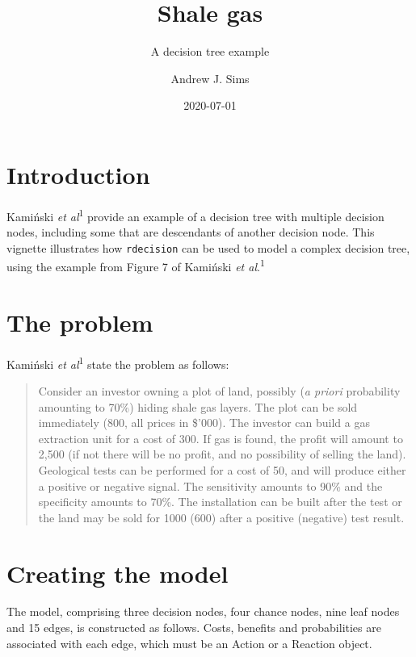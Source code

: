 \documentclass[
]{article}
\title{Shale gas}
\subtitle{A decision tree example}
\author{Andrew J. Sims}
\date{2020-07-01}
\begin{document}
\maketitle

\hypertarget{introduction}{%
\section{Introduction}\label{introduction}}

Kamiński \emph{et al}\textsuperscript{1} provide an example of a
decision tree with multiple decision nodes, including some that are
descendants of another decision node. This vignette illustrates how
\texttt{rdecision} can be used to model a complex decision tree, using
the example from Figure 7 of Kamiński \emph{et al}.\textsuperscript{1}

\hypertarget{the-problem}{%
\section{The problem}\label{the-problem}}

Kamiński \emph{et al}\textsuperscript{1} state the problem as follows:

\begin{quote}
Consider an investor owning a plot of land, possibly (\emph{a priori}
probability amounting to 70\%) hiding shale gas layers. The plot can be
sold immediately (800, all prices in \$'000). The investor can build a
gas extraction unit for a cost of 300. If gas is found, the profit will
amount to 2,500 (if not there will be no profit, and no possibility of
selling the land). Geological tests can be performed for a cost of 50,
and will produce either a positive or negative signal. The sensitivity
amounts to 90\% and the specificity amounts to 70\%. The installation
can be built after the test or the land may be sold for 1000 (600) after
a positive (negative) test result.
\end{quote}

\hypertarget{creating-the-model}{%
\section{Creating the model}\label{creating-the-model}}

The model, comprising three decision nodes, four chance nodes, nine leaf
nodes and 15 edges, is constructed as follows. Costs, benefits and
probabilities are associated with each edge, which must be an Action or
a Reaction object.
\end{document}
